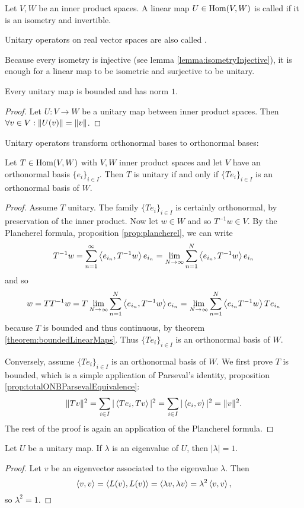 \begin{definition}
Let $V,W$ be an inner product spaces. A linear map $U\in\operatorname{Hom}(V,W)$ is called  if it is an isometry and invertible.

Unitary operators on real vector spaces are also called .
\end{definition}
Because every isometry is injective (see lemma \ref{lemma:isometryInjective}), it is enough for a linear map to be isometric and surjective to be unitary.

\begin{lemma}
Every unitary map is bounded and has norm $1$.
\end{lemma}
\begin{proof}
Let $U: V\to W$ be a unitary map between inner product spaces. Then $\forall v\in V: \lVert U(v)\rVert = \lVert v\rVert$.
\end{proof}

Unitary operators transform orthonormal bases to orthonormal bases:
\begin{proposition}
Let $T\in \operatorname{Hom}(V,W)$ with $V,W$ inner product spaces and let $V$ have an orthonormal basis $\{e_i\}_{i\in I}$. Then $T$ is unitary \textup{if and only if} $\{Te_i\}_{i\in I}$ is an orthonormal basis of $W$.
\end{proposition}
\begin{proof}
Assume $T$ unitary. The family $\{Te_i\}_{i\in I}$ is certainly orthonormal, by preservation of the inner product. Now let $w\in W$ and so $T^{-1}w\in V$. By the Plancherel formula, proposition \ref{prop:plancherel}, we can write
\[ T^{-1}w = \sum_{n=1}^\infty \left\langle e_{i_n},T^{-1}w \right\rangle e_{i_n} = \lim_{N\to\infty}\sum_{n=1}^N \left\langle e_{i_n},T^{-1}w \right\rangle e_{i_n} \]
and so
\[ w = TT^{-1}w = T\lim_{N\to\infty}\sum_{n=1}^N \left\langle e_{i_n},T^{-1}w \right\rangle e_{i_n} = \lim_{N\to\infty}\sum_{n=1}^N \left\langle e_{i_n}T^{-1}w \right\rangle Te_{i_n} \]
because $T$ is bounded and thus continuous, by theorem \ref{theorem:boundedLinearMaps}.
Thus $\{Te_i\}_{i\in I}$ is an orthonormal basis of $W$.

Conversely, assume $\{Te_i\}_{i\in I}$ is an orthonormal basis of $W$. We first prove $T$ is bounded, which is a simple application of Parseval's identity, proposition \ref{prop:totalONBParsevalEquivalence}:
\[ \lVert Tv\rVert^2 = \sum_{i\in I}|\left\langle Te_i,Tv \right\rangle|^2 = \sum_{i\in I}|\left\langle e_i,v \right\rangle|^2 = \lVert v\rVert^2. \]
The rest of the proof is again an application of the Plancherel formula.
\end{proof}

\begin{lemma}
Let $U$ be a unitary map. If $\lambda$ is an eigenvalue of $U$, then $|\lambda| = 1$.
\end{lemma}
\begin{proof}
Let $v$ be an eigenvector associated to the eigenvalue $\lambda$. Then
\[ \left\langle v,v \right\rangle = \left\langle L(v),L(v) \right\rangle = \left\langle \lambda v, \lambda v \right\rangle = \lambda^2\left\langle v,v \right\rangle,  \]
so $\lambda^2 = 1$.
\end{proof}

